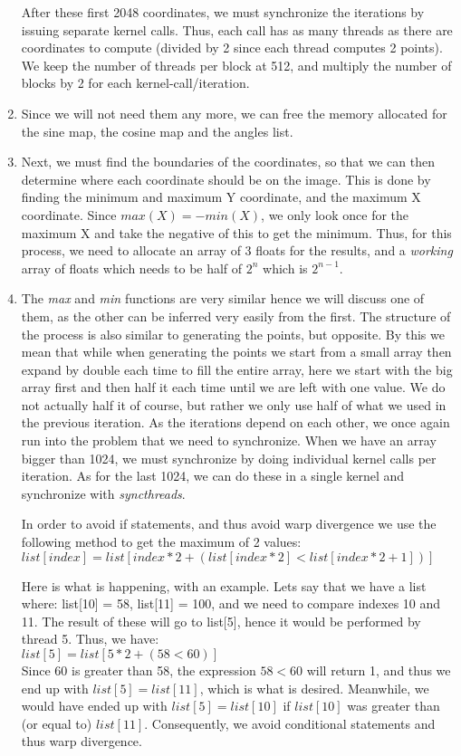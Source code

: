 \begin{enumerate}
	After these first 2048 coordinates, we must synchronize the iterations by issuing separate kernel calls. Thus, each call has as many threads as there are coordinates to compute (divided by 2 since each thread computes 2 points). We keep the number of threads per block at 512, and multiply the number of blocks by 2 for each kernel-call/iteration.
	
	\item Since we will not need them any more, we can free the memory allocated for the sine map, the cosine map and the angles list.
	
	
	
	\item Next, we must find the boundaries of the coordinates, so that we can then determine where each coordinate should be on the image. This is done by finding the minimum and maximum Y coordinate, and the maximum X coordinate. Since $max(X)=-min(X)$, we only look once for the maximum X and take the negative of this to get the minimum. Thus, for this process, we need to allocate an array of 3 floats for the results, and a \textit{working} array of floats which needs to be half of $2^n$ which is $2^{n-1}$.
	
	\item The \textit{max} and \textit{min} functions are very similar hence we will discuss one of them, as the other can be inferred very easily from the first. The structure of the process is also similar to generating the points, but opposite. By this we mean that while when generating the points we start from a small array then expand by double each time to fill the entire array, here we start with the big array first and then half it each time until we are left with one value. We do not actually half it of course, but rather we only use half of what we used in the previous iteration. As the iterations depend on each other, we once again run into the problem that we need to synchronize. When we have an array bigger than 1024, we must synchronize by doing individual kernel calls per iteration. As for the last 1024, we can do these in a single kernel and synchronize with \textit{syncthreads}.
	
	In order to avoid if statements, and thus avoid warp divergence we use the following method to get the maximum of 2 values:\\
	$list[index] = list[ index*2 + (list[index*2] < list[index*2 + 1]) ]$
	
	Here is what is happening, with an example. Lets say that we have a list where: list[10] = 58, list[11] = 100, and we need to compare indexes 10 and 11. The result of these will go to list[5], hence it would be performed by thread 5. Thus, we have:\\
	$list[5] = list[5*2+(58<60)]$\\
	Since 60 is greater than 58, the expression $58<60$ will return 1, and thus we end up with $list[5] = list[11]$, which is what is desired. Meanwhile, we would have ended up with $list[5] = list[10]$ if $list[10]$ was greater than (or equal to) $list[11]$. Consequently, we avoid conditional statements and thus warp divergence.
	

\end{enumerate}

